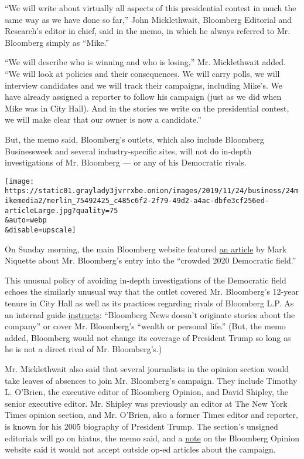``We will write about virtually all aspects of this presidential contest
in much the same way as we have done so far,'' John Micklethwait,
Bloomberg Editorial and Research's editor in chief, said in the memo, in
which he always referred to Mr. Bloomberg simply as ``Mike.''

``We will describe who is winning and who is losing,'' Mr. Micklethwait
added. ``We will look at policies and their consequences. We will carry
polls, we will interview candidates and we will track their campaigns,
including Mike's. We have already assigned a reporter to follow his
campaign (just as we did when Mike was in City Hall). And in the stories
we write on the presidential contest, we will make clear that our owner
is now a candidate.''

But, the memo said, Bloomberg's outlets, which also include Bloomberg
Businessweek and several industry-specific sites, will not do in-depth
investigations of Mr. Bloomberg --- or any of his Democratic rivals.

\texttt{[image: https://static01.graylady3jvrrxbe.onion/images/2019/11/24/business/24mikemedia2/merlin\_75492425\_c485c6f2-2f79-49d2-a4ac-dbfe3cf256ed-articleLarge.jpg?quality=75\\\&auto=webp\\\&disable=upscale]}

On Sunday morning, the main Bloomberg website featured
\href{https://www.bloomberg.com/news/articles/2019-11-24/michael-bloomberg-joins-crowded-2020-democratic-field}{an
article} by Mark Niquette about Mr. Bloomberg's entry into the ``crowded
2020 Democratic field.''

This unusual policy of avoiding in-depth investigations of the
Democratic field echoes the similarly unusual way that the outlet
covered Mr. Bloomberg's 12-year tenure in City Hall as well as its
practices regarding rivals of Bloomberg L.P. As an internal guide
\href{https://www.nytimes3xbfgragh.onion/2014/09/08/business/media/bloomberg-news-stands-out-with-editorial-policy-to-not-report-on-itself.html}{instructs}:
``Bloomberg News doesn't originate stories about the company'' or cover
Mr. Bloomberg's ``wealth or personal life.'' (But, the memo added,
Bloomberg would not change its coverage of President Trump so long as he
is not a direct rival of Mr. Bloomberg's.)

Mr. Micklethwait also said that several journalists in the opinion
section would take leaves of absences to join Mr. Bloomberg's campaign.
They include Timothy L. O'Brien, the executive editor of Bloomberg
Opinion, and David Shipley, the senior executive editor. Mr. Shipley was
previously an editor at The New York Times opinion section, and Mr.
O'Brien, also a former Times editor and reporter, is known for his 2005
biography of President Trump. The section's unsigned editorials will go
on hiatus, the memo said, and a
\href{https://www.bloomberg.com/opinion/articles/2019-11-24/a-note-from-bloomberg-opinion}{note}
on the Bloomberg Opinion website said it would not accept outside op-ed
articles about the campaign.

